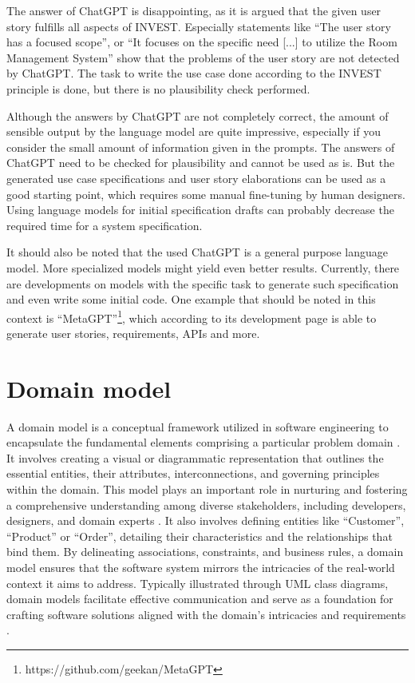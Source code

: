 \documentclass[conference,onecolumn]{IEEEtran}
\begin{document}
The answer of ChatGPT is disappointing, as it is argued that the given user story fulfills all aspects of INVEST. Especially statements like ``The user story has a focused scope'', or ``It focuses on the specific need [...] to utilize the Room Management System'' show that the problems of the user story are not detected by ChatGPT. The task to write the use case done according to the INVEST principle is done, but there is no plausibility check performed.

Although the answers by ChatGPT are not completely correct, the amount of sensible output by the language model are quite impressive, especially if you consider the small amount of information given in the prompts.
The answers of ChatGPT need to be checked for plausibility and cannot be used as is. But the generated use case specifications and user story elaborations can be used as a good starting point, which requires some manual fine-tuning by human designers. Using language models for initial specification drafts can probably decrease the required time for a system specification.

It should also be noted that the used ChatGPT is a general purpose language model. More specialized models might yield even better results.
Currently, there are developments on models with the specific task to generate such specification and even write some initial code. One example that should be noted in this context is ``MetaGPT''\footnote{https://github.com/geekan/MetaGPT}, which according to its development page is able to generate user stories, requirements, APIs and more.




\section{Domain model}
	A domain model is a conceptual framework utilized in software engineering to encapsulate the fundamental elements comprising a particular problem domain \cite{larman2012applying}. It involves creating a visual or diagrammatic representation that outlines the essential entities, their attributes, interconnections, and governing principles within the domain. This model plays an important role in nurturing and fostering a comprehensive understanding among diverse stakeholders, including developers, designers, and domain experts \cite{fowler2004uml}. It also involves defining entities like ``Customer'', ``Product'' or ``Order'', detailing their characteristics and the relationships that bind them. By delineating associations, constraints, and business rules, a domain model ensures that the software system mirrors the intricacies of the real-world context it aims to address. Typically illustrated through UML class diagrams, domain models facilitate effective communication and serve as a foundation for crafting software solutions aligned with the domain's intricacies and requirements \cite{booch1994oo}.
\end{document}
